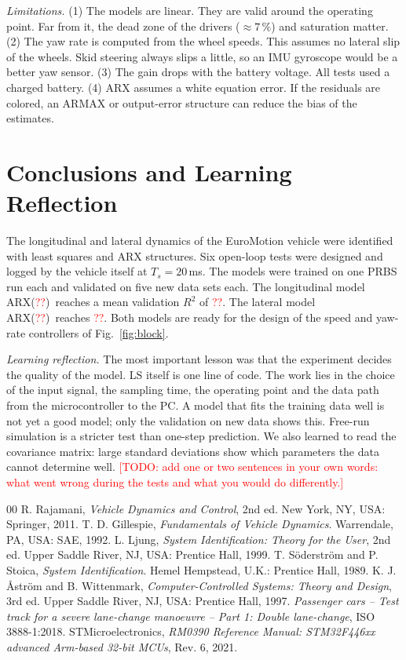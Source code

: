 \documentclass[conference]{IEEEtran}
\newcommand{\NA}{\textcolor{red}{??}}
\newcommand{\LonOrder}{ARX(\NA)}  \newcommand{\LatOrder}{ARX(\NA)}
\newcommand{\LonRval}{\NA}   \newcommand{\LatRval}{\NA}
\newcommand{\todo}[1]{\textcolor{red}{[TODO: #1]}}
\begin{document}
\emph{Limitations.}
(1) The models are linear. They are valid around the operating point. Far
from it, the dead zone of the drivers ($\approx 7\,\%$) and saturation
matter.
(2) The yaw rate is computed from the wheel speeds. This assumes no
lateral slip of the wheels. Skid steering always slips a little, so an IMU
gyroscope would be a better yaw sensor.
(3) The gain drops with the battery voltage. All tests used a charged
battery.
(4) ARX assumes a white equation error. If the residuals are colored, an
ARMAX or output-error structure can reduce the bias of the estimates.

\section{Conclusions and Learning Reflection}
The longitudinal and lateral dynamics of the EuroMotion vehicle were
identified with least squares and ARX structures. Six open-loop tests were
designed and logged by the vehicle itself at $T_s = 20$\,ms. The models
were trained on one PRBS run each and validated on five new data sets
each. The longitudinal model \LonOrder\ reaches a mean validation $R^2$ of
\LonRval. The lateral model \LatOrder\ reaches \LatRval. Both models are
ready for the design of the speed and yaw-rate controllers of
Fig.~\ref{fig:block}.

\emph{Learning reflection.} The most important lesson was that the
experiment decides the quality of the model. LS itself is one line of
code. The work lies in the choice of the input signal, the sampling time,
the operating point and the data path from the microcontroller to the PC.
A model that fits the training data well is not yet a good model; only
the validation on new data shows this. Free-run simulation is a stricter
test than one-step prediction. We also learned to read the covariance
matrix: large standard deviations show which parameters the data cannot
determine well.
\todo{add one or two sentences in your own words: what went wrong during
the tests and what you would do differently.}

\begin{thebibliography}{00}
 R. Rajamani, \emph{Vehicle Dynamics and Control}, 2nd ed.
New York, NY, USA: Springer, 2011.
 T. D. Gillespie, \emph{Fundamentals of Vehicle Dynamics}.
Warrendale, PA, USA: SAE, 1992.
 L. Ljung, \emph{System Identification: Theory for the User},
2nd ed. Upper Saddle River, NJ, USA: Prentice Hall, 1999.
 T. S\"oderstr\"om and P. Stoica, \emph{System
Identification}. Hemel Hempstead, U.K.: Prentice Hall, 1989.
 K. J. \AA str\"om and B. Wittenmark, \emph{Computer-Controlled
Systems: Theory and Design}, 3rd ed. Upper Saddle River, NJ, USA: Prentice
Hall, 1997.
 \emph{Passenger cars -- Test track for a severe lane-change
manoeuvre -- Part 1: Double lane-change}, ISO 3888-1:2018.
 STMicroelectronics, \emph{RM0390 Reference Manual:
STM32F446xx advanced Arm-based 32-bit MCUs}, Rev. 6, 2021.
\end{thebibliography}
\end{document}
